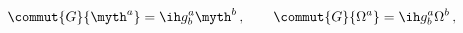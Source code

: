 \begin{equation}
\commut{G}{\myth^a}=\ih g^a_b \myth^b \,,
\qquad
\commut{G}{{\Omega^a}}=
\ih g^a_b {\Omega^b}\,,\label{eq:ghost}
\end{equation}

